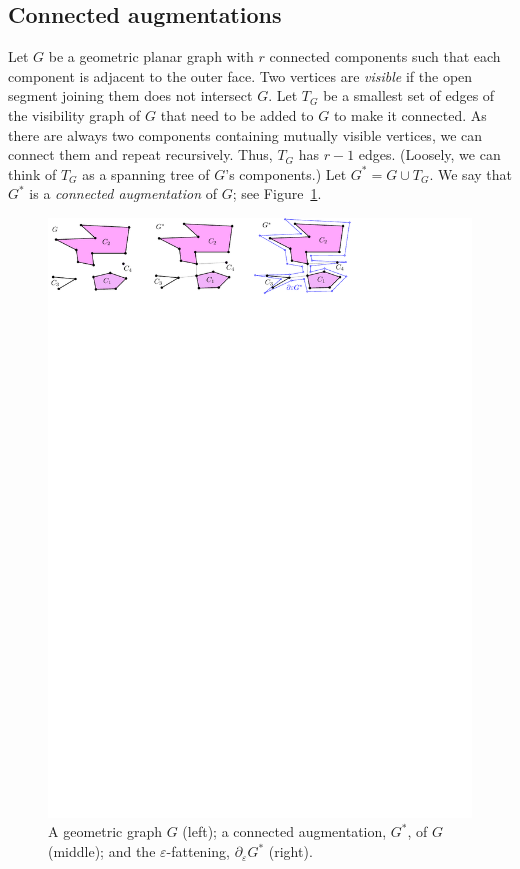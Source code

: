 \documentclass{patmorin}
\begin{document}
\subsection{Connected augmentations}\label{section: connected augmentations}
Let $G$ be a geometric planar graph with $r$ connected components such that each component is adjacent to the outer face.
Two vertices are {\em visible} if the open segment joining them does not intersect $G$.
Let $T_G$ be a smallest set of edges of the visibility graph of $G$ that need to be added to $G$ to make it connected.
As there are always two components containing mutually visible vertices, we can connect them and repeat recursively.  Thus, $T_G$ has $r-1$ edges. (Loosely, we can think of $T_G$ as a spanning tree of $G$'s components.) Let $G^* = G\cup T_G$.  We say that $G^*$ is a \emph{connected augmentation} of $G$; see Figure~\ref{fig:Blowing}.

\begin{figure}[h]
\centering
\includegraphics{img/Blowing.pdf}
\caption{\small A geometric graph $G$ (left); a connected augmentation, $G^*$, of $G$ (middle); and the $\varepsilon$-fattening, $\partial_\varepsilon G^*$ (right).}
\label{fig:Blowing}
\end{figure}
\end{document}

